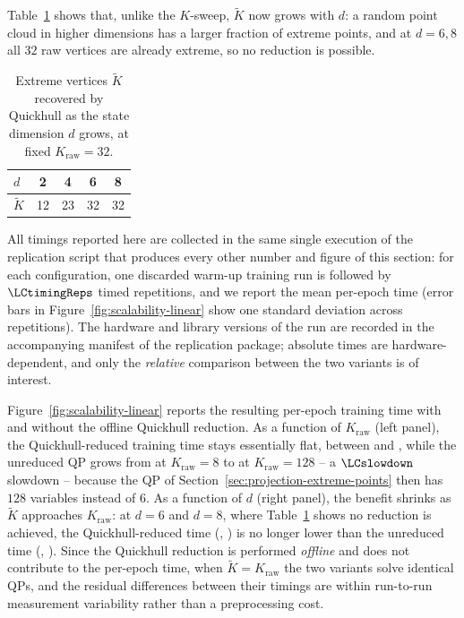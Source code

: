 \documentclass[11pt]{elsarticle}
\theoremstyle{definition}
\theoremstyle{remark}
\numberwithin{equation}{section}
\begin{document}
Table~\ref{tab:quickhull-d} shows that, unlike the $K$-sweep, $\widetilde{K}$
now grows with $d$: a random point cloud in higher dimensions has a larger
fraction of extreme points, and at $d=6,8$ all $32$ raw vertices are already
extreme, so no reduction is possible.

\begin{table}[htbp]
  \centering
  \begin{tabular}{lcccc}
    \toprule
    $d$             & 2  & 4  & 6  & 8  \\
    \midrule
    $\widetilde{K}$ & 12 & 23 & 32 & 32 \\
    \bottomrule
  \end{tabular}
  \caption{Extreme vertices $\widetilde{K}$ recovered by Quickhull as the
  state dimension $d$ grows, at fixed $K_{\mathrm{raw}}=32$.}
  \label{tab:quickhull-d}
\end{table}

All timings reported here are collected in the same single execution of the
replication script that produces every other number and figure of this
section: for each configuration, one discarded warm-up training run is
followed by $\LCtimingReps$ timed repetitions, and we report the mean
per-epoch time (error bars in Figure~\ref{fig:scalability-linear} show one
standard deviation across repetitions). The hardware and library versions
of the run are recorded in the accompanying manifest of the replication
package; absolute times are hardware-dependent, and only the \emph{relative}
comparison between the two variants is of interest.

Figure~\ref{fig:scalability-linear} reports the resulting per-epoch training
time with and without the offline Quickhull reduction. As a function of
$K_{\mathrm{raw}}$ (left panel), the Quickhull-reduced training time stays
essentially flat, between \LCtimeQHmin{} and \LCtimeQHmax, while the
unreduced QP grows from \LCtimeNoQHfirst{} at $K_{\mathrm{raw}}=8$ to
\LCtimeNoQHlast{} at $K_{\mathrm{raw}}=128$ -- a $\LCslowdown$
slowdown -- because the QP of Section~\ref{sec:projection-extreme-points}
then has $128$ variables instead of $6$. As a function of $d$ (right panel),
the benefit shrinks as $\widetilde{K}$ approaches $K_{\mathrm{raw}}$: at
$d=6$ and $d=8$, where Table~\ref{tab:quickhull-d} shows no reduction is
achieved, the Quickhull-reduced time (\LCtimeQHdSix, \LCtimeQHdEight) is
no longer lower than the unreduced time (\LCtimeNoQHdSix,
\LCtimeNoQHdEight). Since the Quickhull reduction is performed
\emph{offline} and does not contribute to the per-epoch time, when
$\widetilde{K}=K_{\mathrm{raw}}$ the two variants solve identical QPs, and
the residual differences between their timings are within run-to-run
measurement variability rather than a preprocessing cost.
\end{document}
